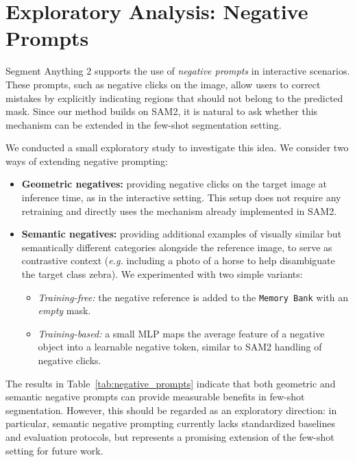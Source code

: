 \section{Exploratory Analysis: Negative Prompts}
\label{sec:supp_negative}

Segment Anything 2 supports the use of \emph{negative prompts} in interactive scenarios. These prompts, such as negative clicks on the image, allow users to correct mistakes by explicitly indicating regions that should not belong to the predicted mask. Since our method builds on SAM2, it is natural to ask whether this mechanism can be extended in the few-shot segmentation setting.  

We conducted a small exploratory study to investigate this idea. We consider two ways of extending negative prompting:  

\begin{itemize}[noitemsep,topsep=2pt,leftmargin=*]
\item \textbf{Geometric negatives:} providing negative clicks on the target image at inference time, as in the interactive setting. This setup does not require any retraining and directly uses the mechanism already implemented in SAM2.  
\item \textbf{Semantic negatives:} providing additional examples of visually similar but semantically different categories alongside the reference image, to serve as contrastive context (\textit{e.g.} including a photo of a horse to help disambiguate the target class zebra). We experimented with two simple variants:  
\begin{itemize}[noitemsep,leftmargin=22pt]
    \item \textit{Training-free:} the negative reference is added to the \texttt{Memory Bank} with an \textit{empty} mask.  
    \item \textit{Training-based:} a small MLP maps the average feature of a negative object into a learnable negative token, similar to SAM2 handling of negative clicks.
\end{itemize}
\end{itemize}

The results in Table~\ref{tab:negative_prompts} indicate that both geometric and semantic negative prompts can provide measurable benefits in few-shot segmentation. However, this should be regarded as an exploratory direction: in particular, semantic negative prompting currently lacks standardized baselines and evaluation protocols, but represents a promising extension of the few-shot setting for future work.


